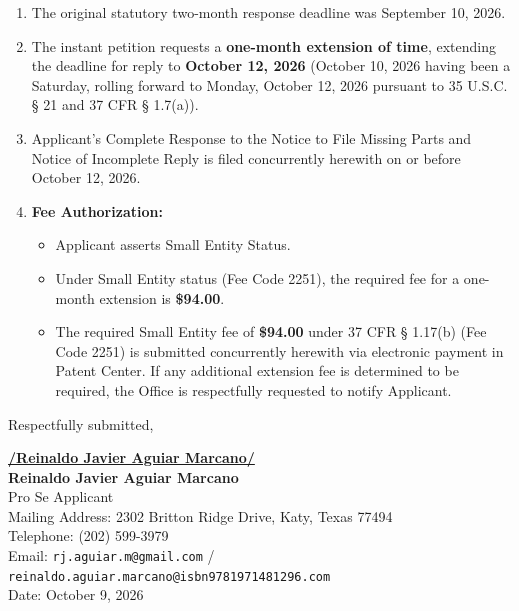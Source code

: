 \documentclass[11pt,letterpaper]{article}
\begin{document}
\begin{enumerate}[leftmargin=2em, itemsep=4pt]
    \item The original statutory two-month response deadline was September 10, 2026.
    \item The instant petition requests a \textbf{one-month extension of time}, extending the deadline for reply to \textbf{October 12, 2026} (October 10, 2026 having been a Saturday, rolling forward to Monday, October 12, 2026 pursuant to 35 U.S.C. \S{} 21 and 37 CFR \S{} 1.7(a)).
    \item Applicant's Complete Response to the Notice to File Missing Parts and Notice of Incomplete Reply is filed concurrently herewith on or before October 12, 2026.
    \item \textbf{Fee Authorization:} 
    \begin{itemize}
        \item Applicant asserts Small Entity Status.
        \item Under Small Entity status (Fee Code 2251), the required fee for a one-month extension is \textbf{\$94.00}.
        \item The required Small Entity fee of \textbf{\$94.00} under 37 CFR \S{} 1.17(b) (Fee Code 2251) is submitted concurrently herewith via electronic payment in Patent Center. If any additional extension fee is determined to be required, the Office is respectfully requested to notify Applicant.
    \end{itemize}
\end{enumerate}

\vspace{1.0cm}
\begin{singlespace}
\noindent Respectfully submitted, \par\vspace{1.5cm}
\underline{\textbf{/Reinaldo Javier Aguiar Marcano/}} \\
\textbf{Reinaldo Javier Aguiar Marcano} \\
Pro Se Applicant \\
Mailing Address: 2302 Britton Ridge Drive, Katy, Texas 77494 \\
Telephone: (202) 599-3979 \\
Email: \texttt{rj.aguiar.m@gmail.com} / \texttt{reinaldo.aguiar.marcano@isbn9781971481296.com} \\
Date: October 9, 2026
\end{singlespace}
\end{document}
